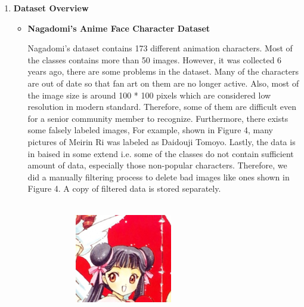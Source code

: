 \documentclass[11.5pt]{article}
\begin{document}
    \begin{enumerate}
        \item \textbf{Dataset Overview}
        \begin{itemize}
            \item \textbf{Nagadomi's Anime Face Character Dataset}

            Nagadomi's dataset contains 173 different animation characters.
            Most of the classes contains more than 50 images.
            However, it was collected 6 years ago, there are some problems in the dataset.
            Many of the characters are out of date so that fan art on them are no longer active.
            Also, most of the image size is around 100 * 100 pixels which are considered low resolution in modern standard.
            Therefore, some of them are difficult even for a senior community member to recognize.
            Furthermore, there exists some falsely labeled images, For example, shown in Figure 4, many pictures of Meirin Ri was labeled as Daidouji Tomoyo.
            Lastly, the data is in baised in some extend i.e. some of the classes do not contain sufficient amount of data, especially those non-popular characters.
            Therefore, we did a manually filtering process to delete bad images like ones shown in Figure 4.
            A copy of filtered data is stored separately.\\ \\
            \begin{figure}[h!]
                \begin{subfigure}[b]{0.5\linewidth}
                    \centering
                    \includegraphics[width=0.5\linewidth]{images/face_795_301_69.png}

\end{subfigure}
\end{figure}
\end{itemize}
\end{enumerate}
\end{document}
